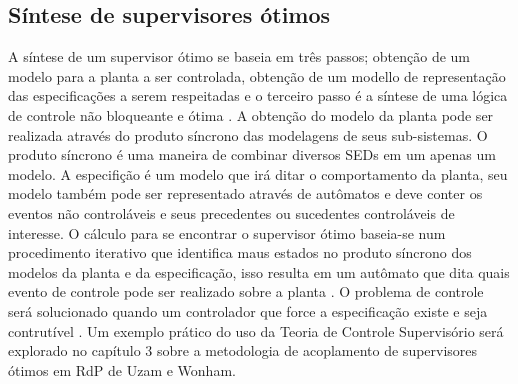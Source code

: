 \subsection{S\'intese de supervisores \'otimos}
A s\'intese de um supervisor \'otimo se baseia em tr\^es passos; obten\c{c}\~ao de um modelo para a planta a ser controlada, obten\c{c}\~ao de um modello de representa\c{c}\~ao das especifica\c{c}\~oes a serem respeitadas e o terceiro passo \'e a s\'intese de uma l\'ogica de controle n\~ao bloqueante e \'otima \cite{apostilacury}.
A obten\c{c}\~ao do modelo da planta pode ser realizada atrav\'es do produto s\'incrono das modelagens de seus sub-sistemas. O produto s\'incrono \'e uma maneira de combinar diversos SEDs em um apenas um modelo. A especifi\c{c}\~ao \'e um modelo que ir\'a ditar o comportamento da planta, seu modelo tamb\'em pode ser representado atrav\'es de aut\^omatos e deve conter os eventos n\~ao control\'aveis e seus precedentes ou sucedentes control\'aveis de interesse. 
O c\'alculo para se encontrar o supervisor \'otimo baseia-se num procedimento iterativo que identifica maus estados no produto s\'incrono dos modelos da planta e da especifica\c{c}\~ao, isso resulta em um aut\^omato que dita quais evento de controle pode ser realizado sobre a planta \cite{apostilacury}.
O problema de controle ser\'a solucionado quando um controlador que force a especifica\c{c}\~ao existe e seja contrut\'ivel \cite{WonhamCai2018}. Um exemplo pr\'atico do uso da Teoria de Controle Supervis\'orio ser\'a explorado no cap\'itulo 3 sobre a metodologia de acoplamento de supervisores \'otimos em RdP de Uzam e Wonham.

